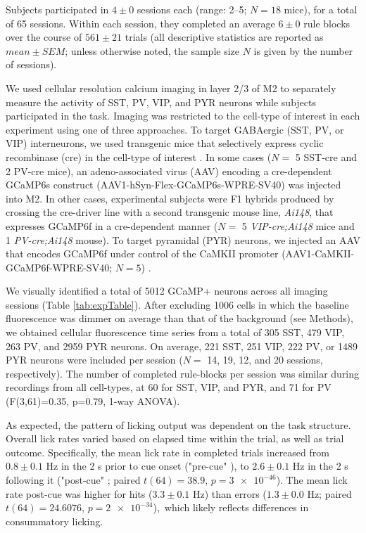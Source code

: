 Subjects participated in $4 \pm 0$ sessions each (range: 2--5; $N=18$ mice), for a total of 65 sessions. Within each session, they completed an average $6 \pm 0$ rule blocks over the course of $561 \pm 21$ trials (all descriptive statistics are reported as $mean \pm SEM$; unless otherwise noted, the sample size $N$ is given by the number of sessions).

We used cellular resolution calcium imaging in layer 2/3 of M2 to separately measure the activity of SST, PV, VIP, and PYR neurons while subjects participated in the task. Imaging was restricted to the cell-type of interest in each experiment using one of three approaches. To target GABAergic (SST, PV, or VIP) interneurons, we used transgenic mice that selectively express cyclic recombinase (cre) in the cell-type of interest \citep{taniguchi11}. In some cases ($N =$ 5 SST-cre and 2 PV-cre mice), an adeno-associated virus (AAV) encoding a cre-dependent GCaMP6s construct (AAV1-hSyn-Flex-GCaMP6s-WPRE-SV40) was injected into M2. In other cases, experimental subjects were F1 hybrids produced by crossing the cre-driver line with a second transgenic mouse line, \textit{Ai148}, that expresses GCaMP6f in a cre-dependent manner \citep{daigle18} ($N =$ 5 \emph{VIP-cre;Ai148} mice and 1 \emph{PV-cre;Ai148} mouse). To target pyramidal (PYR) neurons, we injected an AAV that encodes GCaMP6f under control of the CaMKII promoter (AAV1-CaMKII-GCaMP6f-WPRE-SV40; $N = 5$) \citep{kuchibhotla17, ali20}.

We visually identified a total of \num{5012} GCaMP+ neurons across all imaging sessions (Table \ref{tab:expTable}). After excluding \num{1006} cells in which the baseline fluorescence was dimmer on average than that of the background (see Methods), we obtained cellular fluorescence time series from a total of 305 SST, 479 VIP, 263 PV, and 2959 PYR neurons. On average, 221 SST, 251 VIP, 222 PV, or 1489 PYR neurons were included per session ($N =$ 14, 19, 12, and 20 sessions, respectively). The number of completed rule-blocks per session was similar during recordings from all cell-types, at 60 for SST, VIP,  and PYR, and 71 for PV (F(3,61)=0.35, p=0.79, 1-way ANOVA).      


As expected, the pattern of licking output was dependent on the task structure. Overall lick rates varied based on elapsed time within the trial, as well as trial outcome. Specifically, the mean lick rate in completed trials increased from $0.8 \pm 0.1$ Hz in the 2 s prior to cue onset ("pre-cue" ), to $2.6 \pm 0.1$ Hz in the 2 s following it ("post-cue" ; paired $t(64) =38.9$, $p=\num{3e-46}$). The mean lick rate post-cue was higher for hits ($3.3 \pm 0.1$ Hz) than errors ($1.3 \pm 0.0$ Hz; paired $t(64) =24.6076$, $p=\num{2e-34}$),\ which likely reflects differences in consummatory licking.

